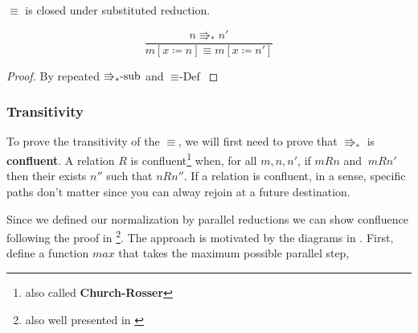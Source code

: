 \begin{cor}
$\equiv$ is closed under substituted reduction.
\end{cor}

\[
\frac{n\Rrightarrow_{\ast}n'}{m\left[x\coloneqq n\right]\equiv m\left[x\coloneqq n'\right]}
\]

\begin{proof}
By repeated $\textrm{\ensuremath{\Rrightarrow_{\ast}}-sub}$ and $\equiv\textrm{-Def}$
\end{proof}

\subsubsection{Transitivity}

To prove the transitivity of the $\equiv$, we will first need to prove that \textbf{$\Rrightarrow_{\ast}$ }is \textbf{confluent}.
A relation $R$ is confluent\footnote{also called \textbf{Church-Rosser}} when, for all $m,n,n'$, if $mRn$ and $\:mRn'$ then their exists $n''$ such that $nRn''$. %
If a relation is confluent, in a sense, specific paths don't matter since you can alway rejoin at a future destination.

Since we defined our normalization by parallel reductions we can show confluence following the proof in \cite{TAKAHASHI1995120}\footnote{also well presented in \cite{KOKKE2020102440}}.
The approach is motivated by the diagrams in .
First, define a function $max$ that takes the maximum possible parallel step, %


